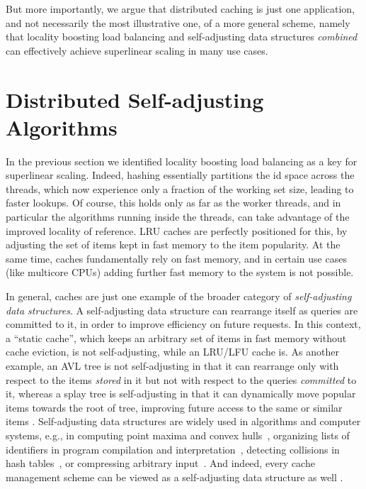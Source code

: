 \documentclass[letterpaper,twocolumn,10pt]{article}
\begin{document}

But more importantly, we argue that distributed caching is just one application, and not necessarily the most illustrative one, of a more general scheme, namely that locality boosting load balancing and self-adjusting data structures \emph{combined} can effectively achieve superlinear scaling in many use cases.

\section{Distributed Self-adjusting Algorithms}
\label{sec:parallel-move-front}

In the previous section we identified locality boosting load balancing as a key for superlinear scaling. Indeed, hashing essentially partitions the id space across the threads, which now experience only a fraction of the working set size, leading to faster lookups. Of course, this holds only as far as the worker threads, and in particular the algorithms running inside the threads, can take advantage of the improved locality of reference. LRU caches are perfectly positioned for this, by adjusting the set of items kept in fast memory to the item popularity. At the same time, caches fundamentally rely on fast memory, and in certain use cases (like multicore CPUs) adding further fast memory to the system is not possible.

In general, caches are just one example of the broader category of \emph{self-adjusting data structures}. A self-adjusting data structure can rearrange itself as queries are committed to it, in order to improve efficiency on future requests. In this context, a ``static cache'', which keeps an arbitrary set of items in fast memory without cache eviction, is not self-adjusting, while an LRU\slash LFU cache is. As another example, an AVL tree is not self-adjusting in that it can rearrange only with respect to the items \emph{stored} in it but not with respect to the queries \emph{committed} to it, whereas a splay tree is self-adjusting in that it can dynamically move popular items towards the root of tree, improving future access to the same or similar items \cite{SleatorT85Splay, BoseDL08, Avin0020}. Self-adjusting data structures are widely used in algorithms and computer systems, e.g., in computing point maxima and convex hulls~\cite{BentleyCL93}, organizing lists of identifiers in program compilation and interpretation~\cite{HesterH85}, detecting collisions in hash tables~\cite{HesterH85}, or compressing arbitrary input~\cite{BentleySTW86}. And indeed, every cache management scheme can be viewed as a self-adjusting data structure as well %
\cite{SleatorT85}.  %
\end{document}
